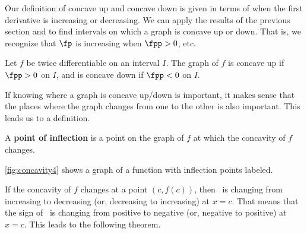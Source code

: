 Our definition of concave up and concave down is given in terms of when the first derivative is increasing or decreasing. We can apply the results of the previous section and to find intervals on which a graph is concave up or down. That is, we recognize that $\fp$ is increasing when $\fpp>0$, etc. 

%
{Let $f$ be twice differentiable on an interval $I$. The graph of $f$ is concave up if $\fpp>0$ on $I$, and is concave down if $\fpp<0$ on $I$. 
}

%
%
%


If knowing where a graph is concave up/down is important, it makes sense that the places where the graph changes from one to the other is also important. This leads us to a definition.

{A \textbf{point of inflection} is a point on the graph of $f$ at which the concavity of $f$ changes.
}

\autoref{fig:concavity4} shows a graph of a function with inflection points labeled.


If the concavity of $f$ changes at a point $(c,f(c))$, then \fp\ is changing from increasing to decreasing (or, decreasing to increasing) at $x=c$. That means that the sign of \fpp\ is changing from positive to negative (or, negative to positive) at $x=c$.  This leads to the following theorem.

